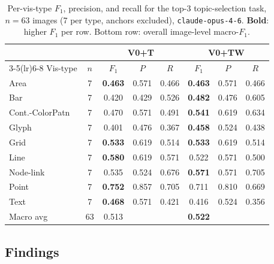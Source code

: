 \begin{table}[h]
\centering
\caption{Per-vis-type $F_1$, precision, and recall for the top-3
  topic-selection task, $n = 63$ images (7 per type, anchors excluded),
  \texttt{claude-opus-4-6}. \textbf{Bold}: higher $F_1$ per row.
  Bottom row: overall image-level macro-$F_1$.}
\label{tab:topicsel-pervistype}
\scriptsize
\setlength{\tabcolsep}{3pt}
\begin{tabular*}{\linewidth}{@{\extracolsep{\fill}}lc ccc ccc@{}}
\toprule
& & \multicolumn{3}{c}{V0+T} & \multicolumn{3}{c}{V0+TW} \\
\cmidrule(lr){3-5}\cmidrule(lr){6-8}
Vis-type & $n$ & $F_1$ & $P$ & $R$ & $F_1$ & $P$ & $R$ \\
\midrule
Area            & 7 & \textbf{0.463} & 0.571 & 0.466 & \textbf{0.463} & 0.571 & 0.466 \\
Bar             & 7 & 0.420 & 0.429 & 0.526 & \textbf{0.482} & 0.476 & 0.605 \\
Cont.-ColorPatn & 7 & 0.470 & 0.571 & 0.491 & \textbf{0.541} & 0.619 & 0.634 \\
Glyph           & 7 & 0.401 & 0.476 & 0.367 & \textbf{0.458} & 0.524 & 0.438 \\
Grid            & 7 & \textbf{0.533} & 0.619 & 0.514 & \textbf{0.533} & 0.619 & 0.514 \\
Line            & 7 & \textbf{0.580} & 0.619 & 0.571 & 0.522 & 0.571 & 0.500 \\
Node-link       & 7 & 0.535 & 0.524 & 0.676 & \textbf{0.571} & 0.571 & 0.705 \\
Point           & 7 & \textbf{0.752} & 0.857 & 0.705 & 0.711 & 0.810 & 0.669 \\
Text            & 7 & \textbf{0.468} & 0.571 & 0.421 & 0.416 & 0.524 & 0.356 \\
\midrule
Macro avg       & 63& 0.513 & & & \textbf{0.522} & & \\
\bottomrule
\end{tabular*}
\end{table}

\subsection{Findings}

